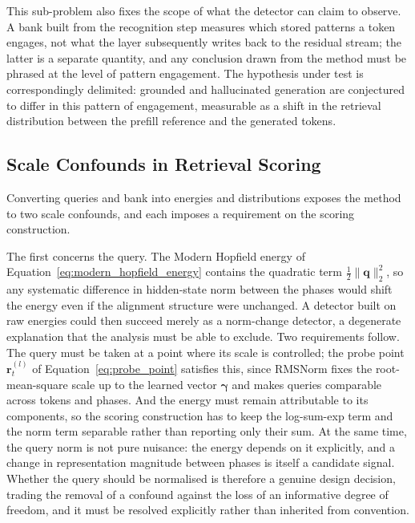 This sub-problem also fixes the scope of what the detector can claim to
observe. A bank built from the recognition step measures which stored
patterns a token engages, not what the layer subsequently writes back to the
residual stream; the latter is a separate quantity, and any conclusion drawn
from the method must be phrased at the level of pattern engagement. The
hypothesis under test is correspondingly delimited: grounded and
hallucinated generation are conjectured to differ in this pattern of
engagement, measurable as a shift in the retrieval distribution between the
prefill reference and the generated tokens.

\subsection{Scale Confounds in Retrieval Scoring}
\label{subsec:pa_scale_confounds}

Converting queries and bank into energies and distributions exposes the
method to two scale confounds, and each imposes a requirement on the scoring
construction.

The first concerns the query. The Modern Hopfield energy of
Equation~\eqref{eq:modern_hopfield_energy} contains the quadratic term
$\tfrac{1}{2}\|\mathbf{q}\|_2^2$, so any systematic difference in
hidden-state norm between the phases would shift the energy even if the
alignment structure were unchanged. A detector built on raw energies could
then succeed merely as a norm-change detector, a degenerate explanation that
the analysis must be able to exclude. Two requirements follow. The query
must be taken at a point where its scale is controlled; the probe point
$\mathbf{r}_t^{(l)}$ of Equation~\eqref{eq:probe_point} satisfies this,
since RMSNorm fixes the root-mean-square scale up to the learned vector
$\boldsymbol{\gamma}$ and makes queries comparable across tokens and phases.
And the energy must remain attributable to its components, so the scoring
construction has to keep the log-sum-exp term and the norm term separable
rather than reporting only their sum. At the same time, the query norm is
not pure nuisance: the energy depends on it explicitly, and a change in
representation magnitude between phases is itself a candidate signal.
Whether the query should be normalised is therefore a genuine design
decision, trading the removal of a confound against the loss of an
informative degree of freedom, and it must be resolved explicitly rather
than inherited from convention.

